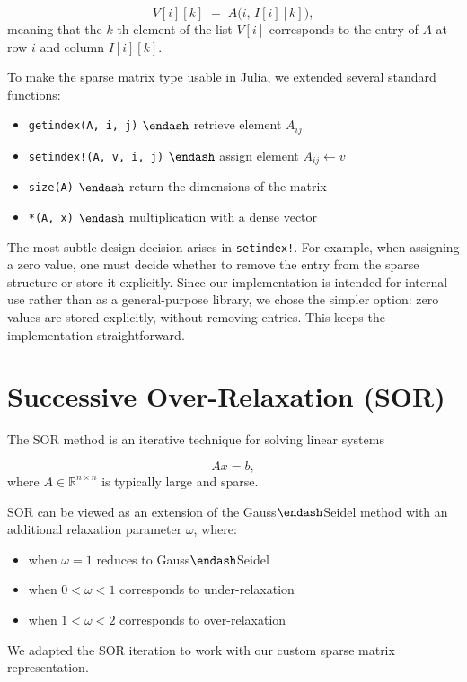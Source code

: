 \documentclass[12pt,a4paper]{article}
\begin{document}
\[
V[i][k] \;=\; A\!\bigl(i,\, I[i][k]\bigr),
\]
meaning that the $k$-th element of the list $V[i]$ corresponds to the entry of $A$ at row $i$ and column $I[i][k]$.

To make the sparse matrix type usable in Julia, we extended several standard functions:

\begin{itemize}
\item \texttt{getindex(A, i, j)} \ensuremath{\endash} retrieve element $A_{ij}$  


\item \texttt{setindex!(A, v, i, j)} \ensuremath{\endash} assign element $A_{ij} \gets v$  


\item \texttt{size(A)} \ensuremath{\endash} return the dimensions of the matrix  


\item \texttt{*(A, x)} \ensuremath{\endash} multiplication with a dense vector  

\end{itemize}
The most subtle design decision arises in \texttt{setindex!}.   For example, when assigning a zero value, one must decide whether to remove the entry from the sparse structure or store it explicitly.   Since our implementation is intended for internal use rather than as a general-purpose library, we chose the simpler option: zero values are stored explicitly, without removing entries. This keeps the implementation straightforward.

\section{Successive Over-Relaxation (SOR)}
The SOR method is an iterative technique for solving linear systems

\[
A x = b,
\]
where $A \in \mathbb{R}^{n \times n}$ is typically large and sparse. 

SOR can be viewed as an extension of the Gauss\ensuremath{\endash}Seidel method with an additional relaxation parameter $\omega$, where:

\begin{itemize}
\item when $\omega = 1$ reduces to Gauss\ensuremath{\endash}Seidel 


\item when $0 < \omega < 1$ corresponds to under-relaxation 


\item when  $1 < \omega < 2$ corresponds to over-relaxation 

\end{itemize}
We adapted the SOR iteration to work with our custom sparse matrix representation.
\end{document}

